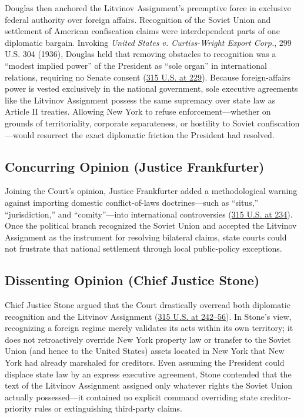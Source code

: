 \documentclass[12pt]{article}
\begin{document}
Douglas then anchored the Litvinov Assignment's preemptive force in exclusive federal authority over foreign affairs. Recognition of the Soviet Union and settlement of American confiscation claims were interdependent parts of one diplomatic bargain. Invoking \textit{United States v. Curtiss-Wright Export Corp.}, 299 U.S. 304 (1936), Douglas held that removing obstacles to recognition was a ``modest implied power'' of the President as ``sole organ'' in international relations, requiring no Senate consent (\href{https://www.law.cornell.edu/supremecourt/text/315/203}{315 U.S. at 229}). Because foreign-affairs power is vested exclusively in the national government, sole executive agreements like the Litvinov Assignment possess the same supremacy over state law as Article II treaties. Allowing New York to refuse enforcement---whether on grounds of territoriality, corporate separateness, or hostility to Soviet confiscation---would resurrect the exact diplomatic friction the President had resolved.

\subsection{Concurring Opinion (Justice Frankfurter)}

Joining the Court's opinion, Justice Frankfurter added a methodological warning against importing domestic conflict-of-laws doctrines---such as ``situs,'' ``jurisdiction,'' and ``comity''---into international controversies (\href{https://caselaw.findlaw.com/court/us-supreme-court/315/203.html}{315 U.S. at 234}). Once the political branch recognized the Soviet Union and accepted the Litvinov Assignment as the instrument for resolving bilateral claims, state courts could not frustrate that national settlement through local public-policy exceptions.

\subsection{Dissenting Opinion (Chief Justice Stone)}

Chief Justice Stone argued that the Court drastically overread both diplomatic recognition and the Litvinov Assignment (\href{https://supreme.justia.com/cases/federal/us/315/203/}{315 U.S. at 242--56}). In Stone's view, recognizing a foreign regime merely validates its acts within its own territory; it does not retroactively override New York property law or transfer to the Soviet Union (and hence to the United States) assets located in New York that New York had already marshaled for creditors. Even assuming the President could displace state law by an express executive agreement, Stone contended that the text of the Litvinov Assignment assigned only whatever rights the Soviet Union actually possessed---it contained no explicit command overriding state creditor-priority rules or extinguishing third-party claims.
\end{document}
